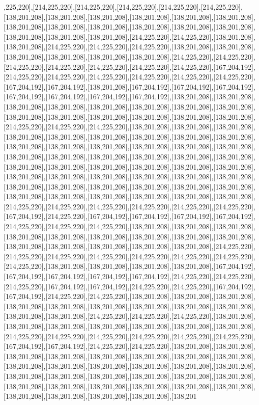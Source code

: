 ,225,220],[214,225,220],[214,225,220],[214,225,220],[214,225,220],[214,225,220],[138,201,208],[138,201,208],[138,201,208],[138,201,208],[138,201,208],[138,201,208],[138,201,208],[138,201,208],[138,201,208],[138,201,208],[138,201,208],[138,201,208],[138,201,208],[138,201,208],[138,201,208],[214,225,220],[214,225,220],[138,201,208],[138,201,208],[214,225,220],[214,225,220],[214,225,220],[138,201,208],[138,201,208],[138,201,208],[138,201,208],[138,201,208],[138,201,208],[214,225,220],[214,225,220],[214,225,220],[214,225,220],[214,225,220],[214,225,220],[214,225,220],[167,204,192],[214,225,220],[214,225,220],[214,225,220],[214,225,220],[214,225,220],[214,225,220],[167,204,192],[167,204,192],[138,201,208],[167,204,192],[167,204,192],[167,204,192],[167,204,192],[167,204,192],[167,204,192],[167,204,192],[138,201,208],[138,201,208],[138,201,208],[138,201,208],[138,201,208],[138,201,208],[138,201,208],[138,201,208],[138,201,208],[138,201,208],[138,201,208],[138,201,208],[138,201,208],[138,201,208],[214,225,220],[214,225,220],[214,225,220],[138,201,208],[138,201,208],[138,201,208],[138,201,208],[138,201,208],[138,201,208],[138,201,208],[138,201,208],[138,201,208],[138,201,208],[138,201,208],[138,201,208],[138,201,208],[138,201,208],[138,201,208],[138,201,208],[138,201,208],[138,201,208],[138,201,208],[138,201,208],[138,201,208],[138,201,208],[138,201,208],[138,201,208],[138,201,208],[138,201,208],[138,201,208],[138,201,208],[138,201,208],[138,201,208],[138,201,208],[138,201,208],[138,201,208],[138,201,208],[138,201,208],[138,201,208],[138,201,208],[138,201,208],[138,201,208],[138,201,208],[138,201,208],[138,201,208],[138,201,208],[138,201,208],[138,201,208],[214,225,220],[214,225,220],[214,225,220],[214,225,220],[214,225,220],[214,225,220],[167,204,192],[214,225,220],[167,204,192],[167,204,192],[167,204,192],[167,204,192],[214,225,220],[214,225,220],[214,225,220],[138,201,208],[138,201,208],[138,201,208],[138,201,208],[138,201,208],[138,201,208],[138,201,208],[138,201,208],[138,201,208],[138,201,208],[138,201,208],[138,201,208],[138,201,208],[138,201,208],[214,225,220],[214,225,220],[214,225,220],[214,225,220],[214,225,220],[214,225,220],[214,225,220],[214,225,220],[138,201,208],[138,201,208],[138,201,208],[138,201,208],[167,204,192],[167,204,192],[167,204,192],[167,204,192],[167,204,192],[214,225,220],[214,225,220],[214,225,220],[167,204,192],[167,204,192],[214,225,220],[214,225,220],[167,204,192],[167,204,192],[214,225,220],[214,225,220],[138,201,208],[138,201,208],[138,201,208],[138,201,208],[138,201,208],[138,201,208],[138,201,208],[138,201,208],[138,201,208],[138,201,208],[138,201,208],[214,225,220],[214,225,220],[214,225,220],[138,201,208],[138,201,208],[138,201,208],[138,201,208],[138,201,208],[138,201,208],[138,201,208],[214,225,220],[214,225,220],[214,225,220],[214,225,220],[214,225,220],[214,225,220],[167,204,192],[167,204,192],[214,225,220],[214,225,220],[138,201,208],[138,201,208],[138,201,208],[138,201,208],[138,201,208],[138,201,208],[138,201,208],[138,201,208],[138,201,208],[138,201,208],[138,201,208],[138,201,208],[138,201,208],[138,201,208],[138,201,208],[138,201,208],[138,201,208],[138,201,208],[138,201,208],[138,201,208],[138,201,208],[138,201,208],[138,201,208],[138,201,208],[138,201,208],[138,201,208],[138,201,208],[138,201,208],[138,201,208],[138,201,208],[138,201